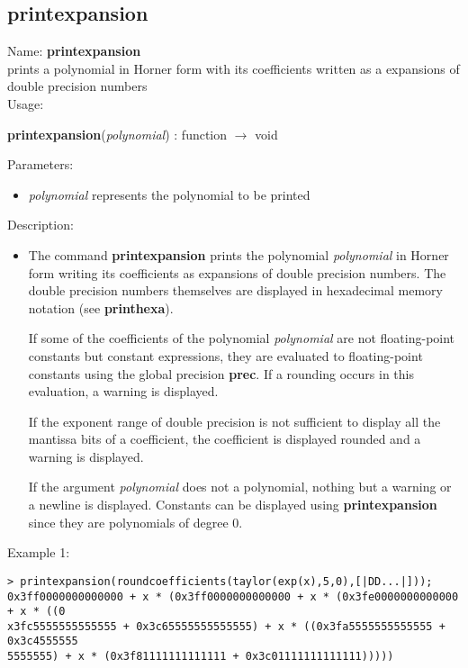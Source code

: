 \subsection{printexpansion}
\label{labprintexpansion}
\noindent Name: \textbf{printexpansion}\\
prints a polynomial in Horner form with its coefficients written as a expansions of double precision numbers\\
\noindent Usage: 
\begin{center}
\textbf{printexpansion}(\emph{polynomial}) : \textsf{function} $\rightarrow$ \textsf{void}
\\ 
\end{center}
Parameters: 
\begin{itemize}
\item \emph{polynomial} represents the polynomial to be printed
\end{itemize}
\noindent Description: \begin{itemize}

\item The command \textbf{printexpansion} prints the polynomial \emph{polynomial} in Horner form
   writing its coefficients as expansions of double precision
   numbers. The double precision numbers themselves are displayed in
   hexadecimal memory notation (see \textbf{printhexa}). 
    
   If some of the coefficients of the polynomial \emph{polynomial} are not
   floating-point constants but constant expressions, they are evaluated
   to floating-point constants using the global precision \textbf{prec}.  If a
   rounding occurs in this evaluation, a warning is displayed.
    
   If the exponent range of double precision is not sufficient to display
   all the mantissa bits of a coefficient, the coefficient is displayed
   rounded and a warning is displayed.
    
   If the argument \emph{polynomial} does not a polynomial, nothing but a
   warning or a newline is displayed. Constants can be displayed using
   \textbf{printexpansion} since they are polynomials of degree $0$.
\end{itemize}
\noindent Example 1: 
\begin{center}\begin{minipage}{15cm}\begin{Verbatim}[frame=single]
> printexpansion(roundcoefficients(taylor(exp(x),5,0),[|DD...|]));
0x3ff0000000000000 + x * (0x3ff0000000000000 + x * (0x3fe0000000000000 + x * ((0
x3fc5555555555555 + 0x3c65555555555555) + x * ((0x3fa5555555555555 + 0x3c4555555
5555555) + x * (0x3f81111111111111 + 0x3c01111111111111)))))
\end{Verbatim}
\end{minipage}\end{center}
